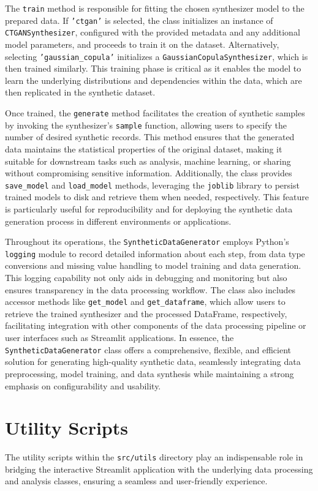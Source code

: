 \documentclass{article}
\begin{document}
The \texttt{train} method is responsible for fitting the chosen synthesizer model to the prepared data. If \texttt{'ctgan'} is selected, the class initializes an instance of \texttt{CTGANSynthesizer}, configured with the provided metadata and any additional model parameters, and proceeds to train it on the dataset. Alternatively, selecting \texttt{'gaussian\_copula'} initializes a \texttt{GaussianCopulaSynthesizer}, which is then trained similarly. This training phase is critical as it enables the model to learn the underlying distributions and dependencies within the data, which are then replicated in the synthetic dataset.

Once trained, the \texttt{generate} method facilitates the creation of synthetic samples by invoking the synthesizer's \texttt{sample} function, allowing users to specify the number of desired synthetic records. This method ensures that the generated data maintains the statistical properties of the original dataset, making it suitable for downstream tasks such as analysis, machine learning, or sharing without compromising sensitive information. Additionally, the class provides \texttt{save\_model} and \texttt{load\_model} methods, leveraging the \texttt{joblib} library to persist trained models to disk and retrieve them when needed, respectively. This feature is particularly useful for reproducibility and for deploying the synthetic data generation process in different environments or applications.

Throughout its operations, the \texttt{SyntheticDataGenerator} employs Python's \texttt{logging} module to record detailed information about each step, from data type conversions and missing value handling to model training and data generation. This logging capability not only aids in debugging and monitoring but also ensures transparency in the data processing workflow. The class also includes accessor methods like \texttt{get\_model} and \texttt{get\_dataframe}, which allow users to retrieve the trained synthesizer and the processed DataFrame, respectively, facilitating integration with other components of the data processing pipeline or user interfaces such as Streamlit applications. In essence, the \texttt{SyntheticDataGenerator} class offers a comprehensive, flexible, and efficient solution for generating high-quality synthetic data, seamlessly integrating data preprocessing, model training, and data synthesis while maintaining a strong emphasis on configurability and usability.

\section*{Utility Scripts}
The utility scripts within the \texttt{src/utils} directory play an indispensable role in bridging the interactive Streamlit application with the underlying data processing and analysis classes, ensuring a seamless and user-friendly experience.
\end{document}
